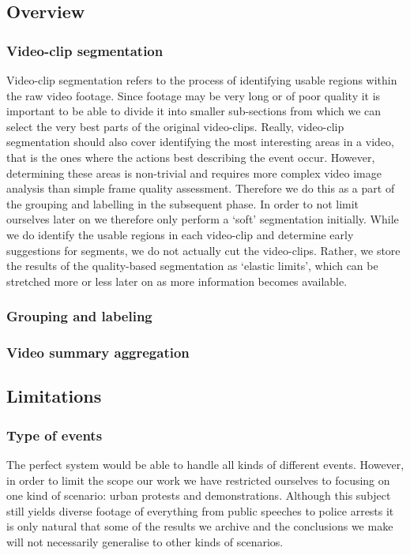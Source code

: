 \documentclass[12pt]{article}
\begin{document}
\subsection{Overview}
%
%
\subsubsection{Video-clip segmentation} \label{sec:videoclipsegmentation}
%
Video-clip segmentation refers to the process of identifying usable regions within the raw video footage. Since footage may be very long or of poor quality it is important to be able to divide it into smaller sub-sections from which we can select the very best parts of the original video-clips. Really, video-clip segmentation should also cover identifying the most interesting areas in a video, that is the ones where the actions best describing the event occur. However, determining these areas is non-trivial and requires more complex video image analysis than simple frame quality assessment. Therefore we do this as a part of the grouping and labelling in the subsequent phase. In order to not limit ourselves later on we therefore only perform a ‘soft’ segmentation initially. While we do identify the usable regions in each video-clip and determine early suggestions for segments, we do not actually cut the video-clips. Rather, we store the results of the quality-based segmentation as ‘elastic limits’, which can be stretched more or less later on as more information becomes available.
\subsubsection{Grouping and labeling}
%
%
\subsubsection{Video summary aggregation}
%
%
\subsection{Limitations}
%
\subsubsection{Type of events}
%
The perfect system would be able to handle all kinds of different events. However, in order to limit the scope our work we have restricted ourselves to focusing on one kind of scenario: urban protests and demonstrations. Although this subject still yields diverse footage of everything from public speeches to police arrests it is only natural that some of the results we archive and the conclusions we make will not necessarily generalise to other kinds of scenarios.
%
\end{document}
